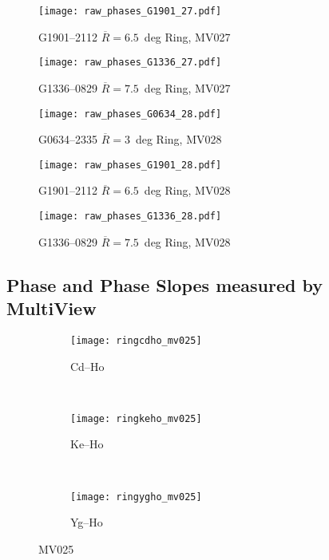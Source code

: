 			\begin{figure}[h]
				\centering
				\texttt{[image: raw\_phases\_G1901\_27.pdf]}
				\caption[G1901--2112 MV027 Phases]{G1901--2112 $\overline{R}=6.5$~deg Ring, MV027}
			\end{figure}
			
			\begin{figure}[h]
				\centering
				\texttt{[image: raw\_phases\_G1336\_27.pdf]}
				\caption[G1336--0829 MV027 Phases]{G1336--0829 $\overline{R}=7.5$~deg Ring, MV027}
			\end{figure}
			
			
			\begin{figure}[h]
				\centering
				\texttt{[image: raw\_phases\_G0634\_28.pdf]}
				\caption[G0634--2335 MV028 Phases]{G0634--2335 $\overline{R}=3$~deg Ring, MV028}
			\end{figure}
			
			\begin{figure}[h]
				\centering
				\texttt{[image: raw\_phases\_G1901\_28.pdf]}
				\caption[G1901--2112 MV028 Phases]{G1901--2112 $\overline{R}=6.5$~deg Ring, MV028}
			\end{figure}
			
			\begin{figure}[h]
				\centering
				\texttt{[image: raw\_phases\_G1336\_28.pdf]}
				\caption[G1336--0829 MV028 Phases]{G1336--0829 $\overline{R}=7.5$~deg Ring, MV028}
			\end{figure}

	\clearpage
	\subsection{Phase and Phase Slopes measured by MultiView} \label{sec:mvphaseslopeplots}
	\begin{figure}[h]
		\centering
		\begin{subfigure}[t]{0.9\textwidth}
			\centering
			\texttt{[image: ringcdho\_mv025]}
			\caption[Cd-Ho MV025]{Cd--Ho}
		\end{subfigure}
		~
		\begin{subfigure}[t]{0.9\textwidth}
			\centering
			\texttt{[image: ringkeho\_mv025]}
			\caption[Ke-Ho MV025]{Ke--Ho}
		\end{subfigure}
		~			
		\begin{subfigure}[t]{0.9\textwidth}
			\centering
			\texttt{[image: ringygho\_mv025]}
			\caption[Yg-Ho MV025]{Yg--Ho}
		\end{subfigure}
		\caption[]{MV025}
	\end{figure}

